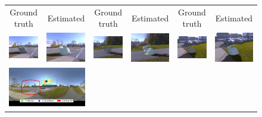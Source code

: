 \begin{figure}[t]
    \centering 
    \footnotesize
    \setlength{\tabcolsep}{1pt}
    \begin{tabular}{cccccc}
    Ground truth & Estimated & Ground truth & Estimated & Ground truth & Estimated \\
    \includegraphics[width=.16\linewidth]{./figures/valid/gt/AG8A2749_Panorama_hdr-corrected_exr-0_png_out.png} &
    \includegraphics[width=.16\linewidth]{./figures/valid/cnn/AG8A2749_Panorama_hdr-corrected_exr-0_png_out.png}\: &
    \includegraphics[width=.16\linewidth]{./figures/valid/gt/AG8A2791_Panorama_hdr-corrected_exr-2_png_out.png} &
    \includegraphics[width=.16\linewidth]{./figures/valid/cnn/AG8A2791_Panorama_hdr-corrected_exr-2_png_out.png}\: &
    \includegraphics[width=.16\linewidth]{./figures/valid/gt/AG8A3169_Panorama_hdr-corrected_exr-5_png_out.png} &
    \includegraphics[width=.16\linewidth]{./figures/valid/cnn/AG8A3169_Panorama_hdr-corrected_exr-5_png_out.png} \\
    \multicolumn{2}{c}{
    \includegraphics[width=\RndrWdth]{./figures/valid/panos/AG8A2749_Panorama_hdr-corrected_exr-0_png.pdf}} &

\end{tabular}
\end{figure}
